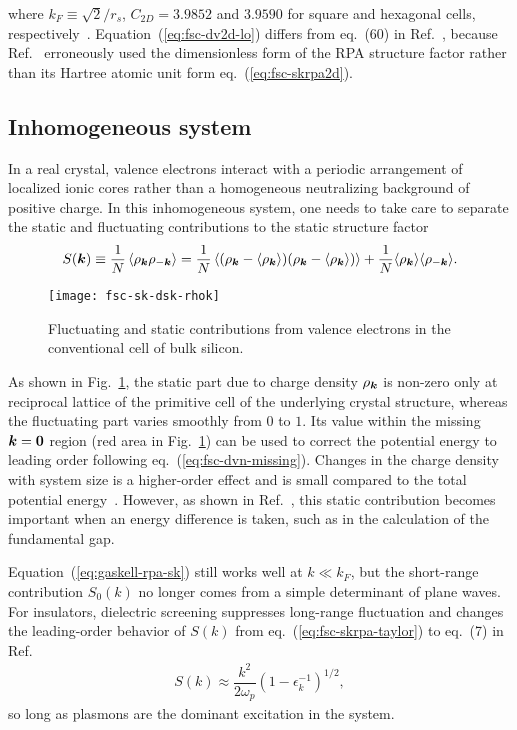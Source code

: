 where $k_F\equiv\sqrt{2}/r_s$, $C_{2D}=3.9852$ and $3.9590$ for square and hexagonal cells, respectively~\cite{Drummond2008}. Equation~(\ref{eq:fsc-dv2d-lo}) differs from eq.~(60) in Ref.~\cite{Drummond2008}, because Ref.~\cite{Drummond2008} erroneously used the dimensionless form of the RPA structure factor rather than its Hartree atomic unit form eq.~(\ref{eq:fsc-skrpa2d}).

\subsection{Inhomogeneous system}
In a real crystal, valence electrons interact with a periodic arrangement of localized ionic cores rather than a homogeneous neutralizing background of positive charge.
In this inhomogeneous system, one needs to take care to separate the static and fluctuating contributions to the static structure factor
\begin{align}
S(\boldsymbol{k}) \equiv \frac{1}{N}\left\langle
\rho_{\boldsymbol{k}}\rho_{-\boldsymbol{k}}
\right\rangle =
\frac{1}{N}\left\langle
(\rho_{\boldsymbol{k}}-\langle\rho_{\boldsymbol{k}}\rangle)(\rho_{\boldsymbol{k}}-\langle\rho_{\boldsymbol{k}}\rangle)
\right\rangle + \frac{1}{N}
\langle\rho_{\boldsymbol{k}}\rangle\langle\rho_{-\boldsymbol{k}}\rangle.
\end{align}
\begin{figure}[h]
\texttt{[image: fsc-sk-dsk-rhok]}
\caption{Fluctuating and static contributions from valence electrons in the conventional cell of bulk silicon.}
\label{fig:fsc-sk-dsk-rhok}
\end{figure}
As shown in Fig.~\ref{fig:fsc-sk-dsk-rhok}, the static part due to charge density $\rho_{\boldsymbol{k}}$ is non-zero only at reciprocal lattice of the primitive cell of the underlying crystal structure, whereas the fluctuating part varies smoothly from $0$ to $1$. Its value within the missing $\boldsymbol{k}=\boldsymbol{0}$ region (red area in Fig.~\ref{fig:fsc-sk-dsk-rhok}) can be used to correct the potential energy to leading order following eq.~(\ref{eq:fsc-dvn-missing}).
Changes in the charge density with system size is a higher-order effect and is small compared to the total potential energy~\cite{Clay2016}. However, as shown in Ref.~\cite{Yang2020-gap}, this static contribution becomes important when an energy difference is taken, such as in the calculation of the fundamental gap.

Equation~(\ref{eq:gaskell-rpa-sk}) still works well at $k\ll k_F$, but the short-range contribution $S_0(k)$ no longer comes from a simple determinant of plane waves. For insulators, dielectric screening suppresses long-range fluctuation and changes the leading-order behavior of $S(k)$ from eq.~(\ref{eq:fsc-skrpa-taylor}) to eq.~(7) in Ref.~\cite{Yang2020-gap}
\begin{align}
S(k) \approx \dfrac{k^2}{2\omega_p}(1-\epsilon_k^{-1})^{1/2},
\end{align}
so long as plasmons are the dominant excitation in the system.

